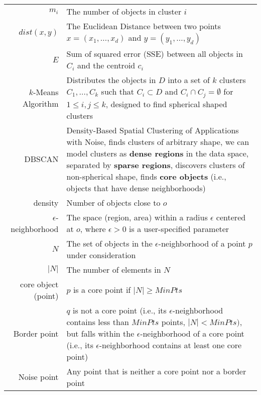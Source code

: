 \documentclass{article}
\begin{document}
\begin{longtable}{Rp{13cm}}
                 $m_i$ & The number of objects in cluster $i$\\

                 $dist(x,y)$ & The Euclidean Distance between two points $x = (x_1, \dots, x_d)$ and $y = (y_1, \dots ,y_d)$\\

                 $E$ & Sum of squared error (SSE) between all objects in $C_i$ and the centroid $c_i$\\

                 $k$-Means Algorithm & Distributes the objects in $D$ into a set of $k$ clusters $C_1, \dots , C_k$ such that $C_i \subset D$ and $C_i \cap C_j = \emptyset$ for $1 \leq i,j \leq k$, designed to find spherical shaped clusters\\

                 DBSCAN & Density-Based Spatial Clustering of Applications with Noise, finds clusters of arbitrary shape, we can model clusters as \textbf{dense regions} in the data space, separated by \textbf{sparse regions}, discovers clusters of non-spherical shape, finds \textbf{core objects} (i.e., objects that have dense neighborhoods)\\

                 density & Number of objects close to $o$\\

                 $\epsilon$-neighborhood & The space (region, area) within a radius $\epsilon$ centered at $o$, where $\epsilon > 0$ is a user-specified parameter\\

                 $N$ & The set of objects in the $\epsilon$-neighborhood of a point $p$ under consideration\\

                 $|N|$ & The number of elements in $N$\\

                 core object (point) & $p$ is a core point if $|N| \geq MinPts$\\

                 Border point & $q$ is not a core point (i.e., its $\epsilon$-neighborhood contains less than $MinPts$ points, $|N| < MinPts)$, but falls within the $\epsilon$-neighborhood of a core point (i.e., its $\epsilon$-neighborhood contains at least one core point)\\

                 Noise point & Any point that is neither a core point nor a border point\\





    \end{longtable}
\end{document}
